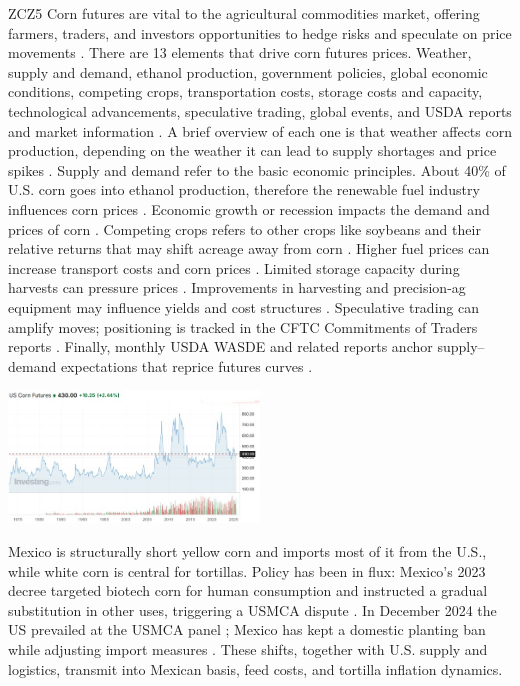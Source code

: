 \documentclass[10pt,a4paper]{article} %
\begin{document}
ZCZ5 Corn futures are vital to the agricultural commodities market, offering farmers, traders, and investors opportunities to hedge risks and speculate on price movements \citep{cme_corn_overview}. There are 13 elements that drive corn futures prices. Weather, supply and demand, ethanol production, government policies, global economic conditions, competing crops, transportation costs, storage costs and capacity, technological advancements, speculative trading, global events, and USDA reports and market information \citep{noaa_enso_discussion,ers_ethanol_40,ers_feedgrains_outlook,ams_gtr_2023,ncga_storage_2025,ers_precision_2023,cftc_cot_about,usda_wasde}. A brief overview of each one is that weather affects corn production, depending on the weather it can lead to supply shortages and price spikes \citep{noaa_enso_discussion}. Supply and demand refer to the basic economic principles. About 40\% of U.S. corn goes into ethanol production, therefore the renewable fuel industry influences corn prices \citep{ers_ethanol_40,ers_ethanol_2030}. Economic growth or recession impacts the demand and prices of corn \citep{ers_feedgrains_topic}. Competing crops refers to other crops like soybeans and their relative returns that may shift acreage away from corn \citep{ers_feedgrains_outlook}. Higher fuel prices can increase transport costs and corn prices \citep{ams_gtr_2023}. Limited storage capacity during harvests can pressure prices \citep{ncga_storage_2025}. Improvements in harvesting and precision-ag equipment may influence yields and cost structures \citep{ers_precision_2023}. Speculative trading can amplify moves; positioning is tracked in the CFTC Commitments of Traders reports \citep{cftc_cot_about,cftc_cot_notes}. Finally, monthly USDA WASDE and related reports anchor supply–demand expectations that reprice futures curves \citep{usda_wasde,usda_understanding_wasde}.



\begin{center}
\includegraphics[width=0.5\textwidth]{figures/corn.jpg}
\end{center}

Mexico is structurally short yellow corn and imports most of it from the U.S., while white corn is central for tortillas. Policy has been in flux: Mexico's 2023 decree targeted biotech corn for human consumption and instructed a gradual substitution in other uses, triggering a USMCA dispute \citep{fas_mexico_decree_2023,ustr_usmca_biotech_2023}. In December 2024 the US prevailed at the USMCA panel \citep{ustr_usmca_biotech_win_2024}; Mexico has kept a domestic planting ban while adjusting import measures \citep{reuters_mexico_gm_ban_2025,fas_mexico_grain_annual_2025}. These shifts, together with U.S. supply and logistics, transmit into Mexican basis, feed costs, and tortilla inflation dynamics.
\end{document}
